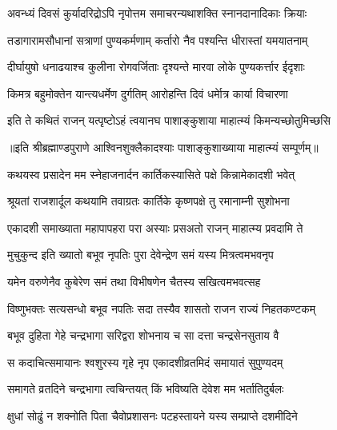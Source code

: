 \twolineshloka
{अवन्ध्यं दिवसं कुर्यादरिद्रोऽपि नृपोत्तम}
{समाचरन्यथाशक्ति स्नानदानादिकाः क्रियाः} %

\twolineshloka
{तडागारामसौधानां सत्राणां पुण्यकर्मणाम्}
{कर्तारो नैव पश्यन्ति धीरास्तां यमयातनाम्} %

\twolineshloka
{दीर्घायुषो धनाढयाश्च कुलीना रोगवर्जिताः}
{दृश्यन्ते मारवा लोके पुण्यकर्त्तार ईदृशाः} %

\twolineshloka
{किमत्र बहुमोक्तेन यान्त्यधर्मेण दुर्गतिम्}
{आरोहन्ति दिवं धर्मेात्र कार्या विचारणा} %

\twolineshloka
{इति ते कथितं राजन् यत्पृष्टोऽहं त्वयानघ}
{पाशाङ्कुशाया माहात्म्यं किमन्यच्छोतुमिच्छसि} %

॥इति श्रीब्रह्माण्डपुराणे आश्विनशुक्लैकादश्याः पाशाङ्कुशाख्याया माहात्म्यं सम्पूर्णम्॥


\hyperref[sec:ekadashi_mahatmyam_vrata_raja]{\closesub}
\clearpage

\label{sec:vrata-raja-karttika-krishna-rama}


\twolineshloka
{कथयस्व प्रसादेन मम स्नेहाजनार्दन}
{कार्तिकस्यासिते पक्षे किन्नामेकादशी भवेत्} %


\twolineshloka
{श्रूयतां राजशार्दूल कथयामि तवाग्रतः}
{कार्तिके कृष्णपक्षे तु रमानाम्नी सुशोभना} %

\twolineshloka
{एकादशी समाख्याता महापापहरा परा}
{अस्याः प्रसअतो राजन् माहात्म्य प्रवदामि ते} %

\twolineshloka
{मुचुकुन्द इति ख्यातो बभूव नृपतिः पुरा}
{देवेन्द्रेण समं यस्य मित्रत्वमभवनृप} %

\twolineshloka
{यमेन वरुणेनैव कुबेरेण समं तथा}
{विभीषणेन चैतस्य सखित्वमभवत्सह} %

\twolineshloka
{विष्णुभक्तः सत्यसन्धो बभूव नपतिः सदा}
{तस्यैव शासतो राजन राज्यं निहतकण्टकम्} %

\twolineshloka
{बभूव दुहिता गेहे चन्द्रभागा सरिद्वरा}
{शोभनाय च सा दत्ता चन्द्रसेनसुताय वै} %

\twolineshloka
{स कदाचित्समायानः श्वशुरस्य गृहे नृप}
{एकादशीव्रतमिदं समायातं सुपुण्यदम्} %

\twolineshloka
{समागते व्रतदिने चन्द्रभागा त्वचिन्तयत्}
{किं भविष्यति देवेश मम भर्तातिदुर्बलः} %

\twolineshloka
{क्षुधां सोढुं न शक्नोति पिता चैवोप्रशासनः}
{पटहस्तायने यस्य सम्प्राप्ते दशमीदिने} %

